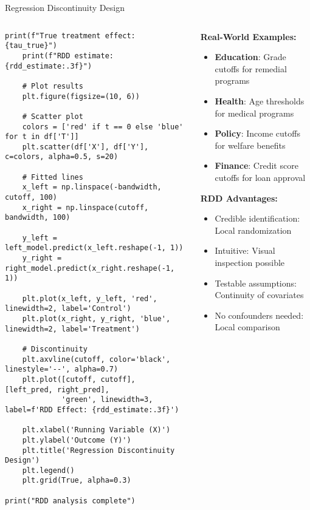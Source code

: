 \documentclass[aspectratio=169,11pt]{beamer}
\begin{document}
\begin{frame}[fragile]{Regression Discontinuity Design}
\begin{columns}
\begin{column}{0.55\textwidth}
\begin{lstlisting}[basicstyle=\ttfamily\tiny]
    print(f"True treatment effect: {tau_true}")
    print(f"RDD estimate: {rdd_estimate:.3f}")
    
    # Plot results
    plt.figure(figsize=(10, 6))
    
    # Scatter plot
    colors = ['red' if t == 0 else 'blue' for t in df['T']]
    plt.scatter(df['X'], df['Y'], c=colors, alpha=0.5, s=20)
    
    # Fitted lines
    x_left = np.linspace(-bandwidth, cutoff, 100)
    x_right = np.linspace(cutoff, bandwidth, 100)
    
    y_left = left_model.predict(x_left.reshape(-1, 1))
    y_right = right_model.predict(x_right.reshape(-1, 1))
    
    plt.plot(x_left, y_left, 'red', linewidth=2, label='Control')
    plt.plot(x_right, y_right, 'blue', linewidth=2, label='Treatment')
    
    # Discontinuity
    plt.axvline(cutoff, color='black', linestyle='--', alpha=0.7)
    plt.plot([cutoff, cutoff], [left_pred, right_pred], 
             'green', linewidth=3, label=f'RDD Effect: {rdd_estimate:.3f}')
    
    plt.xlabel('Running Variable (X)')
    plt.ylabel('Outcome (Y)')
    plt.title('Regression Discontinuity Design')
    plt.legend()
    plt.grid(True, alpha=0.3)
    
print("RDD analysis complete")
\end{lstlisting}
\end{column}
\begin{column}{0.45\textwidth}
\textbf{Real-World Examples:}

\begin{itemize}
\item \textbf{Education}: Grade cutoffs for remedial programs
\item \textbf{Health}: Age thresholds for medical programs
\item \textbf{Policy}: Income cutoffs for welfare benefits
\item \textbf{Finance}: Credit score cutoffs for loan approval
\end{itemize}

\vspace{0.3cm}
\textbf{RDD Advantages:}
\begin{itemize}
\item \textcolor{forest}{Credible identification}: Local randomization
\item \textcolor{forest}{Intuitive}: Visual inspection possible
\item \textcolor{forest}{Testable assumptions}: Continuity of covariates
\item \textcolor{forest}{No confounders needed}: Local comparison
\end{itemize}


\end{column}
\end{columns}
\end{frame}
\end{document}
